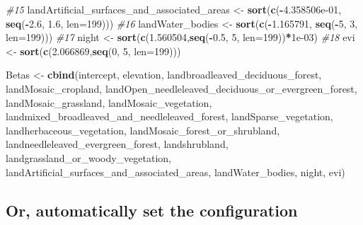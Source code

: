 \documentclass[
]{article}
\newenvironment{Shaded}{\begin{snugshade}}{\end{snugshade}}
\newcommand{\AttributeTok}[1]{\textcolor[rgb]{0.13,0.29,0.53}{#1}}
\newcommand{\CommentTok}[1]{\textcolor[rgb]{0.56,0.35,0.01}{\textit{#1}}}
\newcommand{\DecValTok}[1]{\textcolor[rgb]{0.00,0.00,0.81}{#1}}
\newcommand{\FloatTok}[1]{\textcolor[rgb]{0.00,0.00,0.81}{#1}}
\newcommand{\FunctionTok}[1]{\textcolor[rgb]{0.13,0.29,0.53}{\textbf{#1}}}
\newcommand{\NormalTok}[1]{#1}
\newcommand{\OtherTok}[1]{\textcolor[rgb]{0.56,0.35,0.01}{#1}}
\newcommand{\SpecialCharTok}[1]{\textcolor[rgb]{0.81,0.36,0.00}{\textbf{#1}}}
\begin{document}
\begin{Shaded}
\begin{Highlighting}[]
\CommentTok{\#15}
\NormalTok{landArtificial\_surfaces\_and\_associated\_areas  }\OtherTok{\textless{}{-}} \FunctionTok{sort}\NormalTok{(}\FunctionTok{c}\NormalTok{(}\SpecialCharTok{{-}}\FloatTok{4.358506e{-}01}\NormalTok{, }\FunctionTok{seq}\NormalTok{(}\SpecialCharTok{{-}}\FloatTok{2.6}\NormalTok{, }\FloatTok{1.6}\NormalTok{, }\AttributeTok{len=}\DecValTok{199}\NormalTok{))) }
\CommentTok{\#16}
\NormalTok{landWater\_bodies }\OtherTok{\textless{}{-}} \FunctionTok{sort}\NormalTok{(}\FunctionTok{c}\NormalTok{(}\SpecialCharTok{{-}}\FloatTok{1.165791}\NormalTok{, }\FunctionTok{seq}\NormalTok{(}\SpecialCharTok{{-}}\DecValTok{5}\NormalTok{, }\DecValTok{3}\NormalTok{, }\AttributeTok{len=}\DecValTok{199}\NormalTok{)))   }
\CommentTok{\#17}
\NormalTok{night }\OtherTok{\textless{}{-}} \FunctionTok{sort}\NormalTok{(}\FunctionTok{c}\NormalTok{(}\FloatTok{1.560504}\NormalTok{,}\FunctionTok{seq}\NormalTok{(}\SpecialCharTok{{-}}\FloatTok{0.5}\NormalTok{,  }\DecValTok{5}\NormalTok{, }\AttributeTok{len=}\DecValTok{199}\NormalTok{))}\SpecialCharTok{*}\FloatTok{1e{-}03}\NormalTok{) }
\CommentTok{\#18}
\NormalTok{evi }\OtherTok{\textless{}{-}} \FunctionTok{sort}\NormalTok{(}\FunctionTok{c}\NormalTok{(}\FloatTok{2.066869}\NormalTok{,}\FunctionTok{seq}\NormalTok{(}\DecValTok{0}\NormalTok{,  }\DecValTok{5}\NormalTok{, }\AttributeTok{len=}\DecValTok{199}\NormalTok{)))   }


\NormalTok{Betas }\OtherTok{\textless{}{-}} \FunctionTok{cbind}\NormalTok{(intercept, elevation, landbroadleaved\_deciduous\_forest, }
\NormalTok{               landMosaic\_cropland, }
\NormalTok{               landOpen\_needleleaved\_deciduous\_or\_evergreen\_forest, }
\NormalTok{               landMosaic\_grassland, landMosaic\_vegetation,}
\NormalTok{               landmixed\_broadleaved\_and\_needleleaved\_forest, landSparse\_vegetation, }
\NormalTok{               landherbaceous\_vegetation, landMosaic\_forest\_or\_shrubland,}
\NormalTok{               landneedleleaved\_evergreen\_forest, landshrubland, }
\NormalTok{               landgrassland\_or\_woody\_vegetation, }
\NormalTok{               landArtificial\_surfaces\_and\_associated\_areas,}
\NormalTok{               landWater\_bodies, night, evi)}
\end{Highlighting}
\end{Shaded}

\hypertarget{or-automatically-set-the-configuration}{%
\subsection{Or, automatically set the
configuration}\label{or-automatically-set-the-configuration}}
\end{document}
